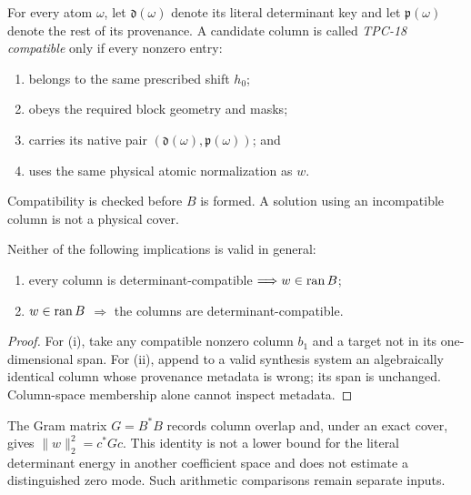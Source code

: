 For every atom \(\omega\), let
\(\mathfrak d(\omega)\) denote its literal determinant key and let
\(\mathfrak p(\omega)\) denote the rest of its provenance.  A
candidate column is called \emph{TPC-18 compatible} only if every
nonzero entry:
\begin{enumerate}[label=(\alph*),leftmargin=2.2em]
\item belongs to the same prescribed shift \(h_0\);
\item obeys the required block geometry and masks;
\item carries its native pair
  \((\mathfrak d(\omega),\mathfrak p(\omega))\); and
\item uses the same physical atomic normalization as \(w\).
\end{enumerate}
Compatibility is checked before \(B\) is formed.  A solution using
an incompatible column is not a physical cover.

\begin{proposition}
\label{prop:compatibility-independent}
Neither of the following implications is valid in general:
\begin{enumerate}[label=(\roman*),leftmargin=2.2em]
\item every column is determinant-compatible
  \(\Longrightarrow w\in\operatorname{ran} B\);
\item \(w\in\operatorname{ran} B\)
  \(\Longrightarrow\) the columns are determinant-compatible.
\end{enumerate}
\end{proposition}

\begin{proof}
For (i), take any compatible nonzero column \(b_1\) and a target not
in its one-dimensional span.  For (ii), append to a valid synthesis
system an algebraically identical column whose provenance metadata is
wrong; its span is unchanged.  Column-space membership alone cannot
inspect metadata.
\end{proof}

\begin{remark}
The Gram matrix \(G=B^*B\) records column overlap and, under an exact
cover, gives \(\|w\|_2^2=c^*Gc\).  This identity is not a lower bound
for the literal determinant energy in another coefficient space and
does not estimate a distinguished zero mode.  Such arithmetic
comparisons remain separate inputs.
\end{remark}
